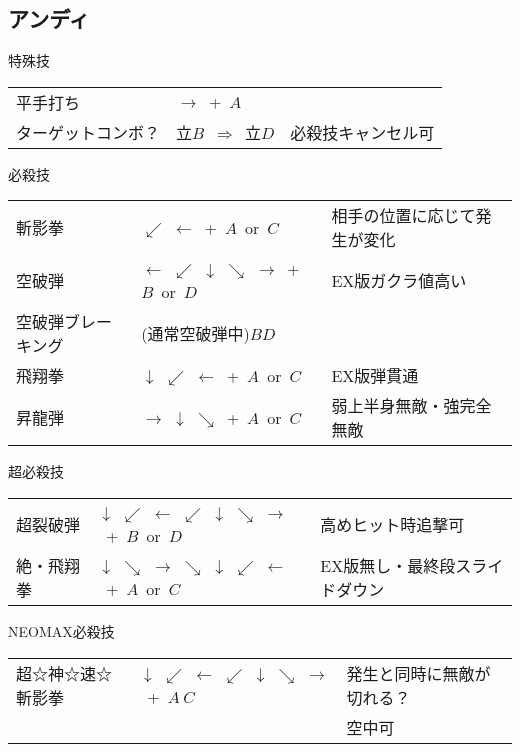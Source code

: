 \documentclass[a4j,11pt]{jarticle}
\def\tatsu{$\downarrow$ $\swarrow$ $\leftarrow$}%
\def\syoryu{$\rightarrow$ $\downarrow$ $\searrow$}%
\def\yoga{$\leftarrow$ $\swarrow$ $\downarrow$ $\searrow$ $\rightarrow$}%
\def\ryuko{$\downarrow$ $\searrow$ $\rightarrow$ $\searrow$ $\downarrow$ $\swarrow$ $\leftarrow$}%
\def\orochi{$\downarrow$ $\swarrow$ $\leftarrow$ $\swarrow$ $\downarrow$ $\searrow$ $\rightarrow$}%
\def\Cancel{$\Longrightarrow$}
\begin{document}
\subsection{アンディ}
\begin{itembox}[l]{特殊技}
\begin{tabular}{lll}
平手打ち&$\rightarrow$\ +\ $A$&\\
ターゲットコンボ？&立$B$\ \Cancel\ 立$D$&必殺技キャンセル可
\end{tabular}
\end{itembox}
\begin{itembox}[l]{必殺技}
\begin{tabular}{lll}
斬影拳&$\swarrow$ $\leftarrow$\ +\ $A$\ or\ $C$&相手の位置に応じて発生が変化\\
空破弾&\yoga\ +\ $B$\ or\ $D$&EX版ガクラ値高い\\
空破弾ブレーキング&(通常空破弾中)$B D$&\\
飛翔拳&\tatsu\ +\ $A$\ or\ $C$&EX版弾貫通\\
昇龍弾&\syoryu\ +\ $A$\ or\ $C$&弱上半身無敵・強完全無敵
\end{tabular}
\end{itembox}
\begin{itembox}[l]{超必殺技}
\begin{tabular}{lll}
超裂破弾&\orochi\ +\ $B$\ or\ $D$&高めヒット時追撃可\\
絶・飛翔拳&\ryuko\ +\ $A$\ or\ $C$&EX版無し・最終段スライドダウン
\end{tabular}
\end{itembox}

\begin{itembox}[l]{NEOMAX必殺技}
\begin{tabular}{lll}
超☆神☆速☆斬影拳&\orochi\ +\ $A\ C$&発生と同時に無敵が切れる？\\
&&空中可
\end{tabular}
\end{itembox}
\newpage
\end{document}
